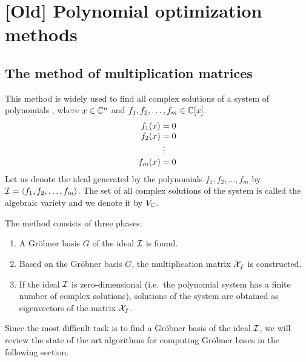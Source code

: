 \chapter{[Old] Polynomial optimization methods}

\section{The method of multiplication matrices}
This method is widely used to find all complex solutions of a system of polynomials , where $x\in\mathbb{C}^n$ and $f_1, f_2, \ldots, f_m\in\mathbb{C}[x]$.
\begin{align}
  \arraycolsep=1.4pt
  \begin{array}{rl}
    f_1(x) &= 0\\
    f_2(x) &= 0\\
    &\vdots\\
    f_m(x) &= 0
  \end{array}\labeleq{pol:mm:polynomialSystem}
\end{align}
Let us denote the ideal generated by the polynomials $f_1, f_2, \ldots, f_m$ by $\mathcal{I} = \langle f_1, f_2, \ldots, f_m\rangle$. The set of all complex solutions of the system  is called the algebraic variety and we denote it by $V_{\mathbb{C}}$.

The method consists of three phases:
\begin{enumerate}
  \item A Gr\"obner basis $G$ of the ideal $\mathcal{I}$ is found.
  \item Based on the Gr\"obner basis $G$, the multiplication matrix $\mathcal{X}_f$ is constructed.
  \item If the ideal $\mathcal{I}$ is zero-dimensional (i.e.\ the polynomial system has a finite number of complex solutions), solutions of the system  are obtained as eigenvectors of the matrix $\mathcal{X}_f$.
\end{enumerate}

Since the most difficult task is to find a Gr\"obner basis of the ideal $\mathcal{I}$, we will review the state of the art algorithms for computing Gr\"obner bases in the following section.

